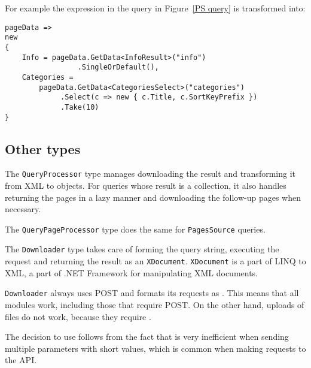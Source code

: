 
For example the expression in the query in Figure~\ref{PS query} is transformed into:

\begin{lstlisting}
pageData =>
new
{
    Info = pageData.GetData<InfoResult>("info")
    		     .SingleOrDefault(),
    Categories =
    	pageData.GetData<CategoriesSelect>("categories")
    		 .Select(c => new { c.Title, c.SortKeyPrefix })
    		 .Take(10)
}
\end{lstlisting}

\subsection{Other types}

The \lstinline{QueryProcessor} type manages downloading the result and transforming it from \ac{XML} to objects.
For queries whose result is a collection, it also handles returning the pages in a lazy manner
and downloading the follow-up pages when necessary.

The \lstinline{QueryPageProcessor} type does the same for \lstinline{PagesSource} queries.

\medskip

The \lstinline{Downloader} type takes care of forming the query string, executing the request and
returning the result as an \lstinline{XDocument}.
\lstinline{XDocument} is a part of LINQ to XML, a part of .NET Framework for manipulating \ac{XML} documents.

\lstinline{Downloader} always uses POST and formats its requests as .
This means that all modules work, including those that require POST.
On the other hand, uploads of files do not work, because they require .

The decision to use  follows from the fact that
 is very inefficient when sending multiple parameters with short values,
which is common when making requests to the \ac{API}.

